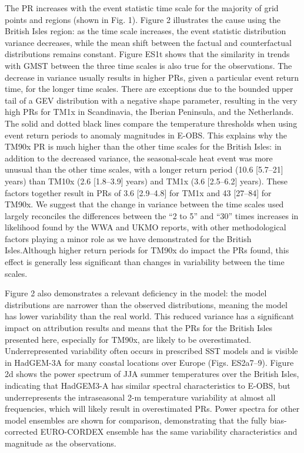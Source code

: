   The PR increases with the event statistic time scale for the majority of grid points and regions (shown in Fig. 1). Figure 2 illustrates the cause using the British Isles region: as the time scale increases, the event statistic distribution variance decreases, while the mean shift between the factual and counterfactual distributions remains constant. Figure ES1t shows that the similarity in trends with GMST between the three time scales is also true for the observations. The decrease in variance usually results in higher PRs, given a particular event return time, for the longer time scales. There are exceptions due to the bounded upper tail of a GEV distribution with a negative shape parameter, resulting in the very high PRs for TM1x in Scandinavia, the Iberian Peninsula, and the Netherlands. The solid and dotted black lines compare the temperature thresholds when using event return periods to anomaly magnitudes in E-OBS. This explains why the TM90x PR is much higher than the other time scales for the British Isles: in addition to the decreased variance, the seasonal-scale heat event was more unusual than the other time scales, with a longer return period (10.6 [5.7--21] years) than TM10x (2.6 [1.8--3.9] years) and TM1x (3.6 [2.5--6.2] years). These factors together result in PRs of 3.6 [2.9--4.8] for TM1x and 43 [27--84] for TM90x. We suggest that the change in variance between the time scales used largely reconciles the differences between the “2 to 5” and “30” times increases in likelihood found by the WWA and UKMO reports, with other methodological factors playing a minor role as we have demonstrated for the British Isles.Although higher return periods for TM90x do impact the PRs found, this effect is generally less significant than changes in variability between the time scales.

  Figure 2 also demonstrates a relevant deficiency in the model: the model distributions are narrower than the observed distributions, meaning the model has lower variability than the real world. This reduced variance has a significant impact on attribution results \citep{bellprat_towards_2019} and means that the PRs for the British Isles presented here, especially for TM90x, are likely to be overestimated. Underrepresented variability often occurs in prescribed SST models \citep{fischer_biased_2018,he_does_2016} and is visible in HadGEM-3A for many coastal locations over Europe (Figs. ES2a7--9). Figure 2d shows the power spectrum of JJA summer temperatures over the British Isles, indicating that HadGEM3-A has similar spectral characteristics to E-OBS, but underrepresents the intraseasonal 2-m temperature variability at almost all frequencies, which will likely result in overestimated PRs. Power spectra for other model ensembles are shown for comparison, demonstrating that the fully bias-corrected EURO-CORDEX ensemble has the same variability characteristics and magnitude as the observations.


